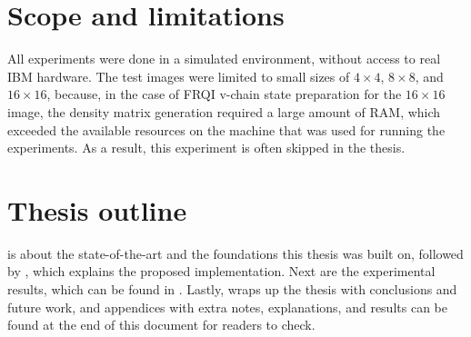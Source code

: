 \section{Scope and limitations}
All experiments were done in a simulated environment, without access to real IBM hardware. The test images were limited to small sizes of $4\times 4$, $8\times 8$, and $16\times 16$, because, in the case of FRQI v-chain state preparation for the $16\times 16$ image, the density matrix generation required a large amount of RAM, which exceeded the available resources on the machine that was used for running the experiments. As a result, this experiment is often skipped in the thesis.

\section{Thesis outline}
 is about the state-of-the-art and the foundations this thesis was built on, followed by , which explains the proposed implementation. Next are the experimental results, which can be found in . Lastly,  wraps up the thesis with conclusions and future work, and appendices with extra notes, explanations, and results can be found at the end of this document for readers to check.
